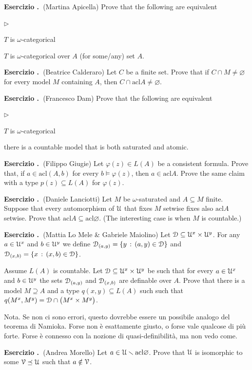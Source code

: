 \documentclass[10pt]{article}
\def\phi{\varphi}
\def\D{\EuScript D}
\def\U{\EuScript U}
\def\V{\EuScript V}
\def\sm{\smallsetminus}
\def\acl{\textrm{acl}}
\newcommand{\labella}[1]{{\sf\footnotesize #1}\hfill}
\renewenvironment{itemize}
  {\begin{list}{$\triangleright$}{%
   \setlength{\parskip}{0mm}
   \setlength{\topsep}{0mm}
   \setlength{\rightmargin}{0mm}
   \setlength{\listparindent}{0mm}
   \setlength{\itemindent}{0mm}
   \setlength{\labelwidth}{3ex}
   \setlength{\itemsep}{0mm}
   \setlength{\parsep}{0mm}
   \setlength{\partopsep}{0mm}
   \setlength{\labelsep}{1ex}
   \setlength{\leftmargin}{\labelwidth+\labelsep}
   \let\makelabel\labella}}{%
   \vspace*{-.3\baselineskip}
  \end{list}}
\newcounter{ex}
\newenvironment{exercise}{\bigskip\addtocounter{ex}{1}\textbf{Esercizio \theex.\ }}{}
\begin{document}
\begin{exercise}(Martina Apicella)
Prove that the following are equivalent
\begin{itemize}   
\item[1.] $T$ is $\omega$-categorical
\item[2.] $T$ is $\omega$-categorical over $A$ (for some/any) set $A$.
\end{itemize}
\end{exercise}

\begin{exercise}(Beatrice Calderaro)
Let $C$ be a finite set.
Prove that if $C\cap M\neq\varnothing$ for every model $M$ containing $A$, then $C\cap\acl A\neq\varnothing$.
\end{exercise}

\begin{exercise}(Francesco Dam)
Prove that the following are equivalent
\begin{itemize}   
\item[1.] $T$ is $\omega$-categorical
\item[2.] there is a countable model that is both saturated and atomic. 
\end{itemize}
\end{exercise}

\begin{exercise}(Filippo Giugie)
  Let $\phi(z)\in L(A)$ be a consistent formula.
  Prove that, if $a\in\acl(A,b)$ for every $b\models\phi(z)$, then $a\in\acl A$.
  Prove the same claim with a type $p(z)\subseteq L(A)$ for $\phi(z)$.
\end{exercise}

\begin{exercise}(Daniele Lanciotti)
  Let $M$ be $\omega$-saturated and $A\subseteq M$ finite.
  Suppose that every automorphism of $\U$ that fixes $M$ setwise fixes also $\acl A$ setwise.
  Prove that $\acl A\subseteq \acl\varnothing$.
  (The interesting case is when $M$ is countable.)
\end{exercise}

\begin{exercise}(Mattia Lo Mele \& Gabriele Maiolino)
  Let $\D\subseteq\U^x\times\U^y$. For any $a\in\U^x$ and $b\in\U^y$ we define $\D_{(a,y)}=\{y\,:\,(a,y)\in\D\}$ and $\D_{(x,b)}=\{x\,:\,(x,b)\in\D\}$.

  Assume $L(A)$ is countable.
  Let $\D\subseteq\U^x\times\U^y$ be such that for every $a\in\U^x$ and $b\in\U^y$ the sets $\D_{(a,y)}$ and $\D_{(x,b)}$ are definable over $A$.
  Prove that there is a model $M\supseteq A$ and a type $q(x,y)\subseteq L(A)$ such such that $q(M^x,M^y)=\D\cap \big(M^x\times M^y\big)$.

  Nota. Se non ci sono errori, questo dovrebbe essere un possibile analogo del teorema di Namioka. Forse non è esattamente giusto, o forse vale qualcose di più forte. Forse è connesso con la nozione di quasi-definibilità, ma non vedo come.
\end{exercise}

\begin{exercise}(Andrea Morello)
Let $a\in\U\sm\acl\varnothing$.
Prove that $\U$ is isomorphic to some $\V\preceq \U$ such that $a\notin\V$.
\end{exercise}
\end{document}
